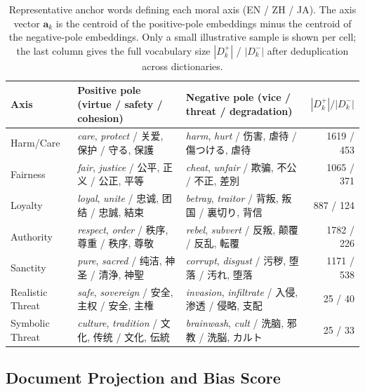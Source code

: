 \documentclass[../CLthesis.tex]{subfiles}
\begin{document}
\begin{table}[htbp]
\centering
\small
\caption{Representative anchor words defining each moral axis (EN / ZH / JA). The axis vector $\mathbf{a}_k$ is the centroid of the positive-pole embeddings minus the centroid of the negative-pole embeddings. Only a small illustrative sample is shown per cell; the last column gives the full vocabulary size $|D_k^+|$ / $|D_k^-|$ after deduplication across dictionaries.}
\label{tab:rq3_anchor_words}
\begin{tabularx}{\textwidth}{l X X r}
\toprule
\textbf{Axis} & \textbf{Positive pole (virtue / safety / cohesion)} & \textbf{Negative pole (vice / threat / degradation)} & \boldmath$|D_k^+| / |D_k^-|$ \\
\midrule
Harm/Care        & \textit{care}, \textit{protect} / 关爱, 保护 / 守る, 保護        & \textit{harm}, \textit{hurt} / 伤害, 虐待 / 傷つける, 虐待         & 1619 / 453 \\
Fairness         & \textit{fair}, \textit{justice} / 公平, 正义 / 公正, 平等        & \textit{cheat}, \textit{unfair} / 欺骗, 不公 / 不正, 差別          & 1065 / 371 \\
Loyalty          & \textit{loyal}, \textit{unite} / 忠诚, 团结 / 忠誠, 結束          & \textit{betray}, \textit{traitor} / 背叛, 叛国 / 裏切り, 背信      & 887 / 124 \\
Authority        & \textit{respect}, \textit{order} / 秩序, 尊重 / 秩序, 尊敬        & \textit{rebel}, \textit{subvert} / 反叛, 颠覆 / 反乱, 転覆         & 1782 / 226 \\
Sanctity         & \textit{pure}, \textit{sacred} / 纯洁, 神圣 / 清浄, 神聖          & \textit{corrupt}, \textit{disgust} / 污秽, 堕落 / 汚れ, 堕落       & 1171 / 538 \\
Realistic Threat & \textit{safe}, \textit{sovereign} / 安全, 主权 / 安全, 主権       & \textit{invasion}, \textit{infiltrate} / 入侵, 渗透 / 侵略, 支配   & 25 / 40 \\
Symbolic Threat  & \textit{culture}, \textit{tradition} / 文化, 传统 / 文化, 伝統    & \textit{brainwash}, \textit{cult} / 洗脑, 邪教 / 洗脳, カルト      & 25 / 33 \\
\bottomrule
\end{tabularx}
\end{table}

\subsection{Document Projection and Bias Score}
\end{document}
